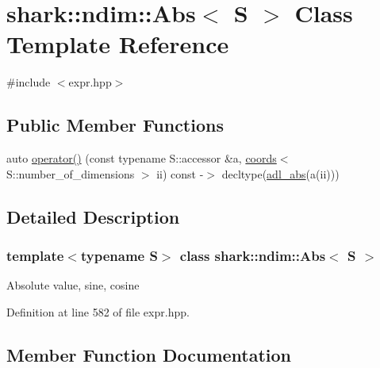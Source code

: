 \hypertarget{classshark_1_1ndim_1_1_abs}{}\section{shark\+:\+:ndim\+:\+:Abs$<$ S $>$ Class Template Reference}
\label{classshark_1_1ndim_1_1_abs}


{\ttfamily \#include $<$expr.\+hpp$>$}

\subsection*{Public Member Functions}
\begin{DoxyCompactItemize}
\item 
auto \hyperlink{classshark_1_1ndim_1_1_abs_a7c29b4bb5074202d55de5ff51bc90db2}{operator()} (const typename S\+::accessor \&a, \hyperlink{structshark_1_1ndim_1_1coords}{coords}$<$ S\+::number\+\_\+of\+\_\+dimensions $>$ ii) const -\/$>$ decltype(\hyperlink{namespaceshark_a01c919545e5586af9484f058f38774b6}{adl\+\_\+abs}(a(ii)))
\end{DoxyCompactItemize}


\subsection{Detailed Description}
\subsubsection*{template$<$typename S$>$\newline
class shark\+::ndim\+::\+Abs$<$ S $>$}

Absolute value, sine, cosine 

Definition at line 582 of file expr.\+hpp.



\subsection{Member Function Documentation}
\hypertarget{classshark_1_1ndim_1_1_abs_a7c29b4bb5074202d55de5ff51bc90db2}{}\label{classshark_1_1ndim_1_1_abs_a7c29b4bb5074202d55de5ff51bc90db2} 
